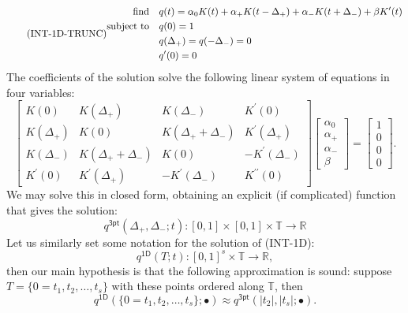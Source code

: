 \documentclass[11pt]{article}
\newcommand{\RR}{\mathbb{R}}
\newcommand{\TT}{\mathbb{T}}
\newcommand{\HS}{\hspace{3.5mm}}
\newcommand{\tp}{\mathsf{3pt}}
\newcommand{\od}{\mathsf{1D}}
\begin{document}
\begin{equation}
    \tag{INT-1D-TRUNC}
    \begin{aligned}
        \text{find} &\HS q(t) = \alpha_0 K(t) + \alpha_+K(t - \Delta_+) + \alpha_-K(t + \Delta_-) + \beta K^\prime(t) \\
        \text{subject to}
        &\HS q(0) = 1 \\
        &\HS q(\Delta_+) = q(-\Delta_-) = 0 \\
        &\HS q^\prime(0) = 0
    \end{aligned}
\end{equation}
The coefficients of the solution solve the following linear system of equations in four variables:
\begin{equation}
    \left[
        \begin{array}{cccc}
          K(0) & K(\Delta_+) & K(\Delta_-) & K^{\prime}(0) \\
          K(\Delta_+) & K(0) & K(\Delta_+ + \Delta_-) & K^\prime(\Delta_+) \\
          K(\Delta_-) & K(\Delta_+ + \Delta_-) & K(0) & -K^\prime(\Delta_-) \\
          K^\prime(0) & K^\prime(\Delta_+) & -K^\prime(\Delta_-) & K^{\prime\prime}(0)
        \end{array}
    \right]
    \left[\begin{array}{c} \alpha_0 \\ \alpha_+ \\ \alpha_- \\ \beta \end{array}\right]
    =
    \left[\begin{array}{c} 1 \\ 0 \\ 0 \\ 0 \end{array}\right].
\end{equation}
We may solve this in closed form, obtaining an explicit (if complicated) function that gives the solution:
\begin{equation}
    q^{\tp}(\Delta_+, \Delta_-; t) : [0, 1] \times [0, 1] \times \TT \to \RR
\end{equation}
Let us similarly set some notation for the solution of (INT-1D):
\begin{equation}
    q^{\od}(T; t): [0, 1]^s \times \TT \to \RR,
\end{equation}
then our main hypothesis is that the following approximation is sound: suppose $T = \{0 = t_1, t_2, \dots, t_s\}$ with these points ordered along $\TT$, then
\begin{equation}
    q^{\od}(\{0 = t_1, t_2, \dots, t_s\}; \bullet) \approx q^{\tp}(|t_2|, |t_s|; \bullet).
\end{equation}
\end{document}
